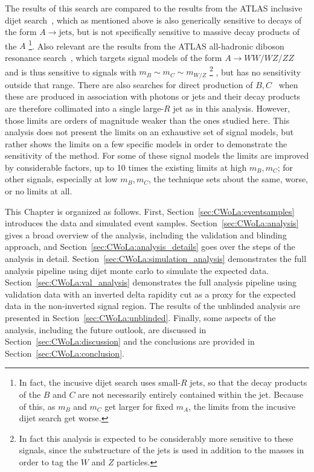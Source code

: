 The results of this search are compared to the results from the ATLAS inclusive dijet search~\cite{Aad:2019hjw}, which as mentioned above is also generically sensitive to decays of the form $A\rightarrow \text{jets}$, but is not specifically sensitive to massive decay products of the $A$
\footnote{In fact, the incusive dijet search uses small-$R$ jets, so that the decay products of the $B$ and $C$ are not necessarily entirely contained within the jet. Because of this, as $m_B$ and $m_C$ get larger for fixed $m_A$, the limits from the incusive dijet search get worse.}.
Also relevant are the results from the ATLAS all-hadronic diboson resonance search~\cite{Aad:2019fbh}, which targets signal models of the form $A\rightarrow WW/WZ/ZZ$ and is thus sensitive to signals with $m_B\sim m_C\sim m_{W/Z}$
\footnote{In fact this analysis is expected to be considerably more sensitive to these signals, since the substructure of the jets is used in addition to the masses in order to tag the $W$ and $Z$ particles.}
, but has no sensitivity outside that range.
There are also searches for direct production of $B,C$~\cite{Aaboud:2018zba,Aaboud:2018fzt,Aaboud:2019zxd} when these are produced in association with photons or jets and their decay products are therefore collimated into a single large-$R$ jet as in this analysis.
However, those limits are orders of magnitude weaker than the ones studied here.
This analysis does not present the limits on an exhaustive set of signal models, but rather shows the limits on a few specific models in order to demonstrate the sensitivity of the method.
For some of these signal models the limits are improved by considerable factors, up to 10 times the existing limits at high $m_B,m_C$;
for other signals, especially at low $m_B,m_C$, the technique sets about the same, worse, or no limits at all.

This Chapter is organized as follows.
First, Section~\ref{sec:CWoLa:eventsamples} introduces the data and simulated event samples.
Section~\ref{sec:CWoLa:analysis} gives a broad overview of the analysis, including the validation and blinding approach, and Section~\ref{sec:CWoLa:analysis_details} goes over the steps of the analysis in detail.
Section~\ref{sec:CWoLa:simulation_analysis} demonstrates the full analysis pipeline using dijet monte carlo to simulate the expected data.
Section~\ref{sec:CWoLa:val_analysis} demonstrates the full analysis pipeline using validation data with an inverted delta rapidity cut as a proxy for the expected data in the non-inverted signal region.
The results of the unblinded analysis are presented in Section~\ref{sec:CWoLa:unblinded}.
Finally, some aspects of the analysis, including the future outlook, are discussed in Section~\ref{sec:CWoLa:discussion} and the conclusions are provided in Section~\ref{sec:CWoLa:conclusion}.

